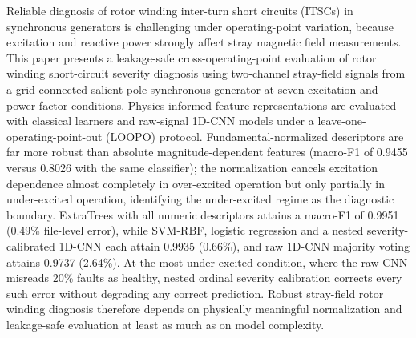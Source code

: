 

Reliable diagnosis of rotor winding inter-turn short circuits (ITSCs) in synchronous
generators is challenging under operating-point variation, because excitation and reactive
power strongly affect stray magnetic field measurements. This paper presents a
leakage-safe cross-operating-point evaluation of rotor winding short-circuit severity
diagnosis using two-channel stray-field signals from a grid-connected salient-pole
synchronous generator at seven excitation and power-factor conditions. Physics-informed
feature representations are evaluated with classical learners and raw-signal 1D-CNN models
under a leave-one-operating-point-out (LOOPO) protocol. Fundamental-normalized descriptors
are far more robust than absolute magnitude-dependent features (macro-F1 of 0.9455 versus
0.8026 with the same classifier); the normalization cancels excitation dependence almost
completely in over-excited operation but only partially in under-excited operation,
identifying the under-excited regime as the diagnostic boundary. ExtraTrees with all
numeric descriptors attains a macro-F1 of 0.9951 (0.49\% file-level error), while SVM-RBF,
logistic regression and a nested severity-calibrated 1D-CNN each attain 0.9935 (0.66\%),
and raw 1D-CNN majority voting attains 0.9737 (2.64\%). At the most under-excited
condition, where the raw CNN misreads 20\% faults as healthy, nested ordinal severity
calibration corrects every such error without degrading any correct prediction. Robust
stray-field rotor winding diagnosis therefore depends on physically meaningful
normalization and leakage-safe evaluation at least as much as on model complexity.


